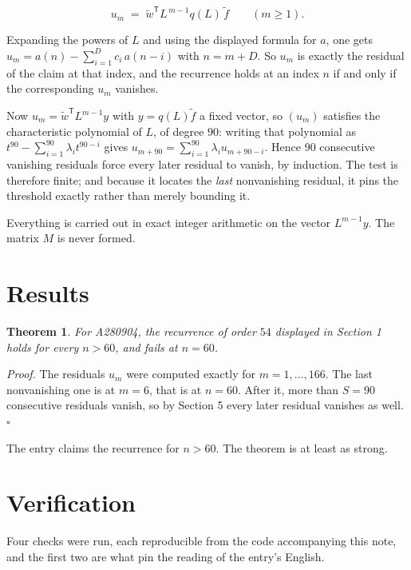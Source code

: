 \documentclass[11pt]{article}
\newtheorem{theorem}{Theorem}
\theoremstyle{definition}
\begin{document}
\[u_m \;=\; \tilde w^{\mathsf T} L^{\,m-1} q(L)\,\tilde f \qquad (m \ge 1).\]

Expanding the powers of $L$ and using the displayed formula for $a$, one gets $u_m = a(n) - \sum_{i=1}^{D} c_i\,a(n-i)$ with $n = m + D$. So $u_m$ is exactly the residual of the claim at that index, and the recurrence holds at an index $n$ if and only if the corresponding $u_m$ vanishes.

Now $u_m = \tilde w^{\mathsf T} L^{m-1} y$ with $y = q(L)\tilde f$ a fixed vector, so $(u_m)$ satisfies the characteristic polynomial of $L$, of degree $90$: writing that polynomial as $t^{90} - \sum_{i=1}^{90} \lambda_i t^{90-i}$ gives $u_{m+90} = \sum_{i=1}^{90} \lambda_i u_{m+90-i}$. Hence $90$ consecutive vanishing residuals force every later residual to vanish, by induction. The test is therefore finite; and because it locates the {\itshape last} nonvanishing residual, it pins the threshold exactly rather than merely bounding it.

Everything is carried out in exact integer arithmetic on the vector $L^{m-1}y$. The matrix $M$ is never formed.

\section{Results}

\begin{theorem} For A280904, the recurrence of order $54$ displayed in Section 1 holds for every $n > 60$, and fails at $n = 60$.\end{theorem}

{\itshape Proof.} The residuals $u_m$ were computed exactly for $m = 1,\dots,166$. The last nonvanishing one is at $m = 6$, that is at $n = 60$. After it, more than $S = 90$ consecutive residuals vanish, so by Section 5 every later residual vanishes as well. $\square$

The entry claims the recurrence for $n > 60$. The theorem is at least as strong.

\section{Verification}

Four checks were run, each reproducible from the code accompanying this note, and the first two are what pin the reading of the entry's English.
\end{document}
